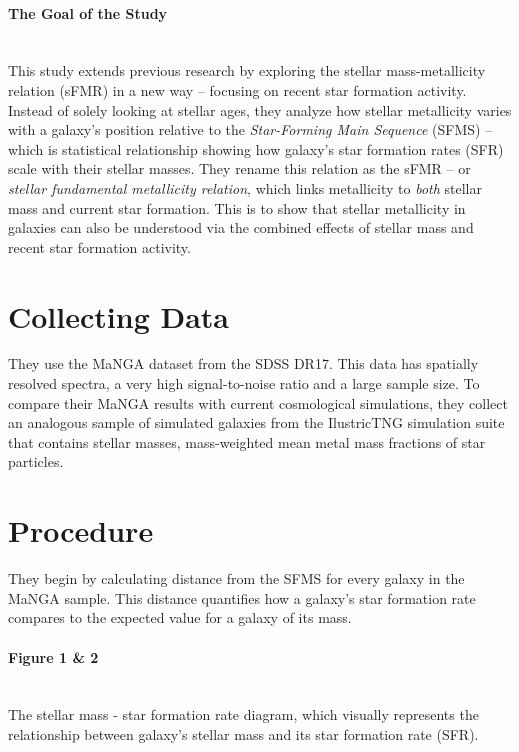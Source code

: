 \documentclass[svgnames]{article}     %
\begin{document}
\paragraph{The Goal of the Study} \mbox{} \\

This study extends previous research by exploring the stellar mass-metallicity
relation (sFMR) in a new way -- focusing on recent star formation activity.
Instead of solely looking at stellar ages, they analyze how stellar metallicity
varies with a galaxy's position relative to the \textit{Star-Forming Main
Sequence} (SFMS) -- which is statistical relationship showing how galaxy's
star formation rates (SFR) scale with their stellar masses. They rename this
relation as the sFMR -- or \textit{stellar fundamental metallicity relation},
which links metallicity  to \textit{both} stellar mass and current star
formation. This is to show that stellar metallicity in galaxies can also be
understood via the combined effects of stellar mass and recent star formation
activity. 

\section{Collecting Data}

They use the MaNGA dataset from the SDSS DR17. This data has spatially resolved
spectra, a very high signal-to-noise ratio and a large sample size. To compare
their MaNGA results with current cosmological simulations, they collect an
analogous sample of simulated galaxies from the IlustricTNG simulation suite
that contains stellar masses, mass-weighted mean metal mass fractions of star
particles.


\section{Procedure}

They begin by calculating distance from the SFMS for every galaxy in the MaNGA
sample. This distance quantifies how a galaxy's star formation rate compares to
the expected value for a galaxy of its mass. 

\paragraph{Figure 1 \& 2} \mbox{} \\ 

The stellar mass - star formation rate diagram, which visually represents the
relationship between galaxy's stellar mass and its star formation rate (SFR).
\\
\end{document}
